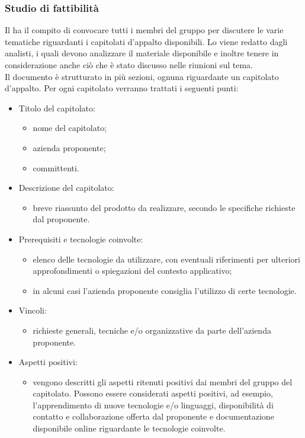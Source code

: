 \subsubsection{Studio di fattibilità}
Il \Responsabile{} ha il compito di convocare tutti i membri del gruppo \Gruppo{} per discutere le varie tematiche riguardanti i capitolati d'appalto disponibili.
Lo \SdF{} viene redatto dagli analisti, i quali devono analizzare il materiale disponibile e inoltre tenere in considerazione anche ciò che è stato discusso nelle riunioni sul tema.\\
Il documento è strutturato in più sezioni, ognuna riguardante un capitolato d'appalto.
Per ogni capitolato verranno trattati i seguenti punti:
\begin{itemize}
\item Titolo del capitolato:
	\begin{itemize}
	\item nome del capitolato;
	\item azienda proponente;
	\item committenti.
	\end{itemize}
\item Descrizione del capitolato:
	\begin{itemize}
	\item breve riassunto del prodotto da realizzare, secondo le specifiche richieste dal proponente.
	\end{itemize}
\item Prerequisiti e tecnologie coinvolte:
	\begin{itemize}
	\item elenco delle tecnologie da utilizzare, con eventuali riferimenti per ulteriori approfondimenti o spiegazioni del contesto applicativo;
	\item in alcuni casi l'azienda proponente consiglia l'utilizzo di certe tecnologie.
	\end{itemize}
\item Vincoli:
	\begin{itemize}
	\item richieste generali, tecniche e/o organizzative da parte dell'azienda proponente.
	\end{itemize}
\item Aspetti positivi:
	\begin{itemize}
	\item vengono descritti gli aspetti ritenuti positivi dai membri del gruppo \Gruppo{} del capitolato.
	Possono essere considerati aspetti positivi, ad esempio, l'apprendimento di nuove tecnologie e/o linguaggi, disponibilità di contatto e collaborazione offerta dal proponente e documentazione disponibile online riguardante le tecnologie coinvolte.

\end{itemize}
\end{itemize}
